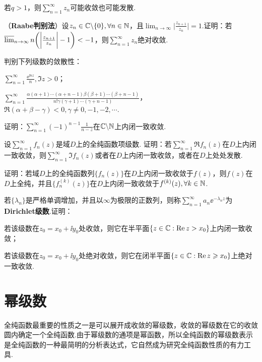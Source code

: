 \begin{xiti}
\begin{enuma}
      \item 若$q>1$，则$\sum_{n=1}^\infty z_n$可能收敛也可能发散.
    \end{enuma}
  \item （\textbf{Raabe判别法}）设$z_n\in\mathbb C\backslash\{0\},\forall n\in \mathbb N$，且$\lim_{n\to\infty}\bigg|\frac{z_{n+1}}{z_n}\bigg|=1$.证明：若$\varlimsup_{n\to\infty}n\bigg(\bigg|\frac{z_{n+1}}{z_n}\bigg|-1\bigg)<-1$，则$\sum_{n=1}^\infty z_n$绝对收敛.
  \item 判别下列级数的敛散性：
    \begin{enuma}
      \item $\sum_{n=1}^\infty\frac{\ee^{\ii nz}}n,\Im z>0$；
      \item $\sum_{n=1}^\infty\frac{\alpha(\alpha+1)\cdots
          (\alpha+n-1)\beta(\beta+1)\cdots(\beta+n-1)}{n!\gamma(\gamma+1)
          \cdots(\gamma+n-1)}$，$\Re(\alpha+\beta-\gamma)<0,\gamma\ne0,-1,-2,\cdots$.
    \end{enuma}
  \item 证明：$\sum_{n=1}^\infty(-1)^{n-1}\frac1{n-z}$在$\mathbb C\backslash\mathbb N$上内闭一致收敛.
  \item 设$\sum_{n=1}^\infty f_n(z)$是域$D$上的全纯函数项级数. 证明：若$\sum_{n=1}^\infty\Re f_n(z)$在$D$上内闭一致收敛，则$\sum_{n=1}^\infty \Im f_n(z)$或者在$D$上内闭一致收敛，或者在$D$上处处发散.
  \item 证明：若域$D$上的全纯函数列$\{f_n(z)\}$在$D$上内闭一致收敛于$f(z)$，则$f(z)$在$D$上全纯，并且$\{f_n^{(k)}(z)\}$在$D$上内闭一致收敛于$f^{(k)}(z),\forall k\in\mathbb N$.
  \item 若$\{\lambda_n\}$是严格单调增加，并且以$\infty$为极限的正数列，则称$\sum_{n=1}^\infty a_n\ee^{-\lambda_n z}$为\textbf{Dirichlet级数}.证明：
    \begin{enuma}
      \item 若该级数在$z_0=x_0+\ii y_0$处收敛，则它在半平面$\{z\in\mathbb C:\operatorname{Re} z>x_0\}$上内闭一致收敛；
      \item 若该级数在$z_0=x_0+\ii y_0$处绝对收敛，则它在闭半平面$\{z\in\mathbb C:\operatorname{Re} z\geqslant x_0\}$上绝对一致收敛.
    \end{enuma}
\end{xiti}

\section{幂级数\label{sec4.2}}
全纯函数最重要的性质之一是可以展开成收敛的幂级数，收敛的幂级数在它的收敛圆内确定一个全纯函数.由于幂级数的通项是幂函数，所以全纯函数的幂级数表示是全纯函数的一种最简明的分析表达式，它自然成为研究全纯函数性质的有力工具.

